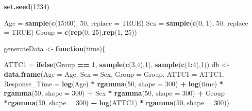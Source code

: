\documentclass[
]{article}
\newenvironment{Shaded}{\begin{snugshade}}{\end{snugshade}}
\newcommand{\AttributeTok}[1]{\textcolor[rgb]{0.13,0.29,0.53}{#1}}
\newcommand{\ConstantTok}[1]{\textcolor[rgb]{0.56,0.35,0.01}{#1}}
\newcommand{\ControlFlowTok}[1]{\textcolor[rgb]{0.13,0.29,0.53}{\textbf{#1}}}
\newcommand{\DecValTok}[1]{\textcolor[rgb]{0.00,0.00,0.81}{#1}}
\newcommand{\FunctionTok}[1]{\textcolor[rgb]{0.13,0.29,0.53}{\textbf{#1}}}
\newcommand{\NormalTok}[1]{#1}
\newcommand{\OtherTok}[1]{\textcolor[rgb]{0.56,0.35,0.01}{#1}}
\newcommand{\SpecialCharTok}[1]{\textcolor[rgb]{0.81,0.36,0.00}{\textbf{#1}}}
\begin{document}
\begin{Shaded}
\begin{Highlighting}[]
\FunctionTok{set.seed}\NormalTok{(}\DecValTok{1234}\NormalTok{)}

\NormalTok{Age }\OtherTok{=} \FunctionTok{sample}\NormalTok{(}\FunctionTok{c}\NormalTok{(}\DecValTok{15}\SpecialCharTok{:}\DecValTok{60}\NormalTok{), }\DecValTok{50}\NormalTok{, }\AttributeTok{replace =} \ConstantTok{TRUE}\NormalTok{)}
\NormalTok{Sex }\OtherTok{=} \FunctionTok{sample}\NormalTok{(}\FunctionTok{c}\NormalTok{(}\DecValTok{0}\NormalTok{, }\DecValTok{1}\NormalTok{), }\DecValTok{50}\NormalTok{, }\AttributeTok{replace =} \ConstantTok{TRUE}\NormalTok{)}
\NormalTok{Group }\OtherTok{=} \FunctionTok{c}\NormalTok{(}\FunctionTok{rep}\NormalTok{(}\DecValTok{0}\NormalTok{, }\DecValTok{25}\NormalTok{),}\FunctionTok{rep}\NormalTok{(}\DecValTok{1}\NormalTok{, }\DecValTok{25}\NormalTok{))}

\NormalTok{generateData }\OtherTok{\textless{}{-}} \ControlFlowTok{function}\NormalTok{(time)\{}
  
\NormalTok{  ATTC1 }\OtherTok{=} \FunctionTok{ifelse}\NormalTok{(Group }\SpecialCharTok{==} \DecValTok{1}\NormalTok{, }\FunctionTok{sample}\NormalTok{(}\FunctionTok{c}\NormalTok{(}\DecValTok{3}\NormalTok{,}\DecValTok{4}\NormalTok{),}\DecValTok{1}\NormalTok{), }\FunctionTok{sample}\NormalTok{(}\FunctionTok{c}\NormalTok{(}\DecValTok{1}\SpecialCharTok{:}\DecValTok{4}\NormalTok{),}\DecValTok{1}\NormalTok{))}
\NormalTok{  db }\OtherTok{\textless{}{-}} \FunctionTok{data.frame}\NormalTok{(}\AttributeTok{Age =}\NormalTok{ Age,}
                   \AttributeTok{Sex =}\NormalTok{ Sex,}
                   \AttributeTok{Group =}\NormalTok{ Group,}
                   \AttributeTok{ATTC1 =}\NormalTok{ ATTC1,}
                   \AttributeTok{Response\_Time =} \FunctionTok{log}\NormalTok{(Age) }\SpecialCharTok{*} \FunctionTok{rgamma}\NormalTok{(}\DecValTok{50}\NormalTok{, }\AttributeTok{shape =} \DecValTok{300}\NormalTok{) }\SpecialCharTok{+}
                        \FunctionTok{log}\NormalTok{(time) }\SpecialCharTok{*} \FunctionTok{rgamma}\NormalTok{(}\DecValTok{50}\NormalTok{, }\AttributeTok{shape =} \DecValTok{300}\NormalTok{) }\SpecialCharTok{+} 
\NormalTok{                        Sex }\SpecialCharTok{*} \FunctionTok{rgamma}\NormalTok{(}\DecValTok{50}\NormalTok{, }\AttributeTok{shape =} \DecValTok{300}\NormalTok{) }\SpecialCharTok{+} 
\NormalTok{                        Group }\SpecialCharTok{*}\FunctionTok{rgamma}\NormalTok{(}\DecValTok{50}\NormalTok{, }\AttributeTok{shape =} \DecValTok{300}\NormalTok{) }\SpecialCharTok{+} 
                        \FunctionTok{log}\NormalTok{(ATTC1) }\SpecialCharTok{*} \FunctionTok{rgamma}\NormalTok{(}\DecValTok{50}\NormalTok{, }\AttributeTok{shape =} \DecValTok{300}\NormalTok{))}
  

\end{Highlighting}
\end{Shaded}
\end{document}
